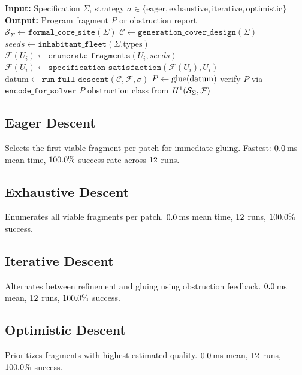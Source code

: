 \documentclass[11pt]{article}
\newcommand{\FragmentSpace}{\mathcal{F}}
\newcommand{\SpecSpace}{\mathcal{S}_\Sigma}
\begin{document}
\begin{algorithm}[H]
\caption{Synthesis via Descent Search}
\label{alg:descent}
\begin{algorithmic}[1]
\STATE \textbf{Input:} Specification $\Sigma$, strategy $\sigma \in
       \{\text{eager}, \text{exhaustive}, \text{iterative},
       \text{optimistic}\}$
\STATE \textbf{Output:} Program fragment $P$ or obstruction report
\STATE $\SpecSpace \gets \texttt{formal\_core\_site}(\Sigma)$
\STATE $\mathcal{C} \gets \texttt{generation\_cover\_design}(\Sigma)$
\STATE $\textit{seeds} \gets \texttt{inhabitant\_fleet}(\Sigma.\text{types})$
  \STATE $\FragmentSpace(U_i) \gets \texttt{enumerate\_fragments}(U_i, \textit{seeds})$
  \STATE $\FragmentSpace(U_i) \gets \texttt{specification\_satisfaction}(\FragmentSpace(U_i), U_i)$
\ENDFOR
\STATE $\text{datum} \gets \texttt{run\_full\_descent}(\mathcal{C}, \FragmentSpace, \sigma)$
  \STATE $P \gets \mathrm{glue}(\text{datum})$
  \STATE verify $P$ via $\texttt{encode\_for\_solver}$
  \RETURN $P$
\ELSE
  \RETURN obstruction class from $\Hcoh{1}(\SpecSpace, \FragmentSpace)$
\ENDIF
\end{algorithmic}
\end{algorithm}

\subsection{Eager Descent}
Selects the first viable fragment per patch for immediate gluing.
Fastest: $0.0$\,ms mean time, $100.0\%$
success rate across $12$ runs.

\subsection{Exhaustive Descent}
Enumerates all viable fragments per patch.  $0.0$\,ms
mean time, $12$ runs,
$100.0\%$ success.

\subsection{Iterative Descent}
Alternates between refinement and gluing using obstruction feedback.
$0.0$\,ms mean, $12$
runs, $100.0\%$ success.

\subsection{Optimistic Descent}
Prioritizes fragments with highest estimated quality.
$0.0$\,ms mean, $12$
runs, $100.0\%$ success.
\end{document}
